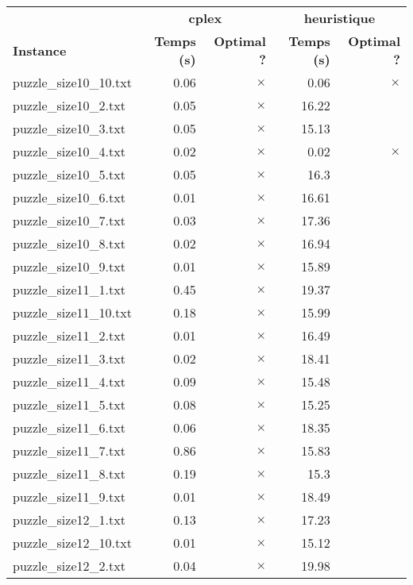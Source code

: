 \documentclass{article}
\begin{document}
\newpage
\begin{center}
\renewcommand{\arraystretch}{1.4} 
\begin{tabular}{lrrrr}
	\hline
 & \multicolumn{2}{c}{\textbf{cplex}} & \multicolumn{2}{c}{\textbf{heuristique}}\\
\textbf{Instance}  & \textbf{Temps (s)} & \textbf{Optimal ?}  & \textbf{Temps (s)} & \textbf{Optimal ?} \\\hline

puzzle\_size10\_10.txt & 0.06 & 
$\times$
 & 0.06 & 
$\times$
\\
puzzle\_size10\_2.txt & 0.05 & 
$\times$
 & 16.22 & 
\\
puzzle\_size10\_3.txt & 0.05 & 
$\times$
 & 15.13 & 
\\
puzzle\_size10\_4.txt & 0.02 & 
$\times$
 & 0.02 & 
$\times$
\\
puzzle\_size10\_5.txt & 0.05 & 
$\times$
 & 16.3 & 
\\
puzzle\_size10\_6.txt & 0.01 & 
$\times$
 & 16.61 & 
\\
puzzle\_size10\_7.txt & 0.03 & 
$\times$
 & 17.36 & 
\\
puzzle\_size10\_8.txt & 0.02 & 
$\times$
 & 16.94 & 
\\
puzzle\_size10\_9.txt & 0.01 & 
$\times$
 & 15.89 & 
\\
puzzle\_size11\_1.txt & 0.45 & 
$\times$
 & 19.37 & 
\\
puzzle\_size11\_10.txt & 0.18 & 
$\times$
 & 15.99 & 
\\
puzzle\_size11\_2.txt & 0.01 & 
$\times$
 & 16.49 & 
\\
puzzle\_size11\_3.txt & 0.02 & 
$\times$
 & 18.41 & 
\\
puzzle\_size11\_4.txt & 0.09 & 
$\times$
 & 15.48 & 
\\
puzzle\_size11\_5.txt & 0.08 & 
$\times$
 & 15.25 & 
\\
puzzle\_size11\_6.txt & 0.06 & 
$\times$
 & 18.35 & 
\\
puzzle\_size11\_7.txt & 0.86 & 
$\times$
 & 15.83 & 
\\
puzzle\_size11\_8.txt & 0.19 & 
$\times$
 & 15.3 & 
\\
puzzle\_size11\_9.txt & 0.01 & 
$\times$
 & 18.49 & 
\\
puzzle\_size12\_1.txt & 0.13 & 
$\times$
 & 17.23 & 
\\
puzzle\_size12\_10.txt & 0.01 & 
$\times$
 & 15.12 & 
\\
puzzle\_size12\_2.txt & 0.04 & 
$\times$
 & 19.98 & 
\\

\end{tabular}
\end{center}
\end{document}
